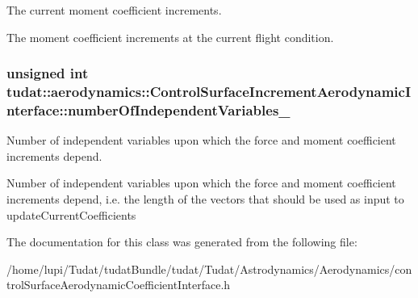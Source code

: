 The current moment coefficient increments. 

The moment coefficient increments at the current flight condition. 
\subsubsection[{\texorpdfstring{number\+Of\+Independent\+Variables\+\_\+}{numberOfIndependentVariables_}}]{\setlength{\rightskip}{0pt plus 5cm}unsigned int tudat\+::aerodynamics\+::\+Control\+Surface\+Increment\+Aerodynamic\+Interface\+::number\+Of\+Independent\+Variables\+\_\+\hspace{0.3cm}{\ttfamily [protected]}}\hypertarget{classtudat_1_1aerodynamics_1_1ControlSurfaceIncrementAerodynamicInterface_ac8d30947065270db44a70ba9344236c2}{}\label{classtudat_1_1aerodynamics_1_1ControlSurfaceIncrementAerodynamicInterface_ac8d30947065270db44a70ba9344236c2}


Number of independent variables upon which the force and moment coefficient increments depend. 

Number of independent variables upon which the force and moment coefficient increments depend, i.\+e. the length of the vectors that should be used as input to update\+Current\+Coefficients 

The documentation for this class was generated from the following file\+:\begin{DoxyCompactItemize}
\item 
/home/lupi/\+Tudat/tudat\+Bundle/tudat/\+Tudat/\+Astrodynamics/\+Aerodynamics/control\+Surface\+Aerodynamic\+Coefficient\+Interface.\+h\end{DoxyCompactItemize}

